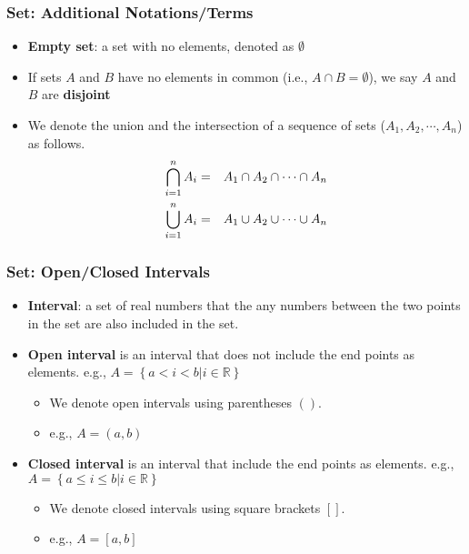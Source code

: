 \documentclass[pdflatex, 12pt]{beamer}
\newcommand{\R}{\mathbb{R}}
\begin{document}
\begin{frame}
\frametitle{Set: Additional Notations/Terms}
\begin{itemize}
\item \textbf{Empty set}: a set with no elements, denoted as $\emptyset$
\vspace{0.4cm}
\item If sets $A$ and $B$ have no elements in common (i.e., $A \cap B = \emptyset$), we say $A$ and $B$ are \textbf{disjoint}
\vspace{0.4cm}
\item We denote the union and the intersection of a sequence of sets ($A_1, A_2, \cdots, A_n$) as follows.
 \begin{eqnarray}
 \bigcap_{i = 1}^{n} A_i &=& A_1 \cap A_2 \cap \cdots \cap A_n \notag \\
 \bigcup_{i = 1}^{n} A_i &=& A_1 \cup A_2 \cup \cdots \cup A_n \notag 
 \end{eqnarray}
\end{itemize}
\end{frame}

\begin{frame}
\frametitle{Set: Open/Closed Intervals}
\begin{itemize}
\item \textbf{Interval}: a set of real numbers that the any numbers between the two points in the set are also included in the set.
\vspace{0.4cm}
\item \textbf{Open interval} is an interval that does not include the end points as elements. e.g., $A = \left\{a < i < b| i \in \R\right\}$
 \begin{itemize}
 \item We denote open intervals using parentheses $()$.
 \item e.g., $A = (a, b)$
 \end{itemize}
\vspace{0.4cm}
\item \textbf{Closed interval} is an interval that include the end points as elements. e.g., $A = \left\{a \leq i \leq b| i \in \R\right\}$
 \begin{itemize}
 \item We denote closed intervals using square brackets $[]$.
 \item e.g., $A = [a, b]$
 \end{itemize}
\end{itemize}
\end{frame}
\end{document}
